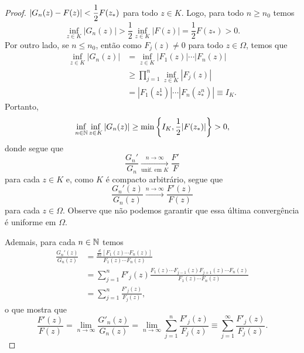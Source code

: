 \begin{proof}
       $|G_n(z) - F(z)| < \displaystyle{\frac{1}{2} F(z_*) }$ para todo 
       $z\in K$. Logo, para todo $n\geq n_0$ temos
       \begin{equation*}
           \inf_{z\in K} |G_n(z)| > \frac{1}{2}\inf_{z\in K} |F(z)| 
                                  = \frac{1}{2} F(z_*) > 0.
       \end{equation*}
       Por outro lado, se $n\leq n_0$, então como $F_j(z)\neq 0$ para todo 
       $z\in\Omega$, temos que
       \begin{align*}
           \inf_{z\in K} |G_n(z)| &= \inf_{z\in K} |F_1(z)|\cdots|F_n(z)| \\
                                  &\geq \prod_{j=1}^n \inf_{z\in K} |F_j(z)| \\
                                  &= |F_1(z^1_*)| \cdots |F_n(z^n_*)| \equiv I_K.
       \end{align*}
       Portanto, 
       \begin{equation*}
           \inf_{n\in\mathbb{N}} \inf_{z\in K} |G_n(z)| 
           \geq \min\left\{ I_K, \frac{1}{2}|F(z_*)| \right\} > 0,
       \end{equation*}
       donde segue que 
       \begin{equation*}
           \frac{G_n'}{G_n} \xrightarrow[\text{unif. em } K]{n\to\infty} \frac{F'}{F}
       \end{equation*}
       para cada $z\in K$ e, como $K$ é compacto arbitrário, segue que
       \begin{equation*}
           \frac{G_n'(z)}{G_n(z)} \xrightarrow{n\to\infty} \frac{F'(z)}{F(z)}
       \end{equation*}
       para cada $z\in\Omega$. Observe que não podemos garantir que essa última
       convergência é uniforme em $\Omega$.
       
       Ademais, para cada $n\in\mathbb{N}$ temos
       \begin{align*}
           \frac{G_n'(z)}{G_n(z)} 
           &= \frac{ \frac{d}{dz}[F_1(z)\cdots F_n(z)] }{F_1(z)\cdots F_n(z)} \\
           &= \sum_{j=1}^n F'_j(z)
           \frac{F_1(z)\cdots F_{j-1}(z)F_{j+1}(z)\cdots F_n(z)}{F_1(z)\cdots F_n(z)} 
           \\
           &= \sum_{j=1}^n \frac{F'_j(z)}{F_j(z)},
       \end{align*}
       o que mostra que
       \begin{equation*}
           \frac{F'(z)}{F(z)} = \lim_{n\to\infty} \frac{G'_n(z)}{G_n(z)}
                              = \lim_{n\to\infty} \sum_{j=1}^n \frac{F'_j(z)}{F_j(z)}
                              \equiv \sum_{j=1}^{\infty} \frac{F'_j(z)}{F_j(z)}.
       \end{equation*}
    \end{proof}
    
